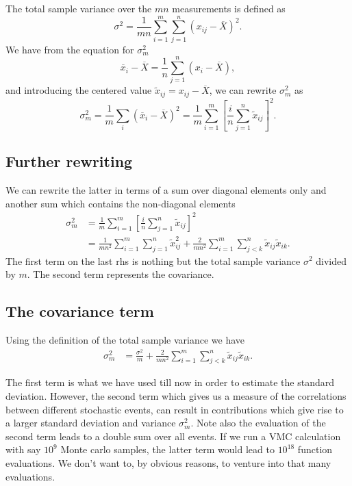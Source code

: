 \documentclass[%
oneside,                 %
final,                   %
10pt]{article}
\begin{document}
The total sample variance over the $mn$ measurements is defined as
\[
\sigma^2=\frac{1}{mn}\sum_{i=1}^{m} \sum_{j=1}^{n}\left(x_{ij}-\overline{X}\right)^2.
\]
We have from the equation for $\sigma_m^2$ 
\[
\overline{x}_i-\overline{X}=\frac{1}{n}\sum_{j=1}^{n}\left(x_{i}-\overline{X}\right),
\]
and introducing the centered value $\tilde{x}_{ij}=x_{ij}-\overline{X}$, we can rewrite $\sigma_m^2$ as
\[
\sigma^2_{m}=\frac{1}{m}\sum_{i} \left( \overline{x}_{i}-\overline{X}\right)^2=\frac{1}{m}\sum_{i=1}^{m}\left[ \frac{i}{n}\sum_{j=1}^{n}\tilde{x}_{ij}\right]^2.
\]

\subsection*{Further rewriting}

We can rewrite the latter in terms of a sum over diagonal elements only and another sum which contains the non-diagonal elements
\begin{align*}
\sigma^2_{m}& =\frac{1}{m}\sum_{i=1}^{m}\left[ \frac{i}{n}\sum_{j=1}^{n}\tilde{x}_{ij}\right]^2 \\
            & = \frac{1}{mn^2}\sum_{i=1}^{m} \sum_{j=1}^{n}\tilde{x}_{ij}^2+\frac{2}{mn^2}\sum_{i=1}^{m} \sum_{j<k}^{n}\tilde{x}_{ij}\tilde{x}_{ik}.
\end{align*}
The first term on the last rhs is nothing but the total sample variance $\sigma^2$ divided by $m$. The second term represents the covariance.

\subsection*{The covariance term}

Using the definition of the total sample variance we have
\begin{align*}
\sigma^2_{m}& = \frac{\sigma^2}{m}+\frac{2}{mn^2}\sum_{i=1}^{m} \sum_{j<k}^{n}\tilde{x}_{ij}\tilde{x}_{ik}.
\end{align*}

The first term is what we have used till now in order to estimate the
standard deviation. However, the second term which gives us a measure
of the correlations between different stochastic events, can result in
contributions which give rise to a larger standard deviation and
variance $\sigma_m^2$. Note also the evaluation of the second term
leads to a double sum over all events. If we run a VMC calculation
with say $10^9$ Monte carlo samples, the latter term would lead to
$10^{18}$ function evaluations. We don't want to, by obvious reasons, to venture into that many evaluations.
\end{document}
